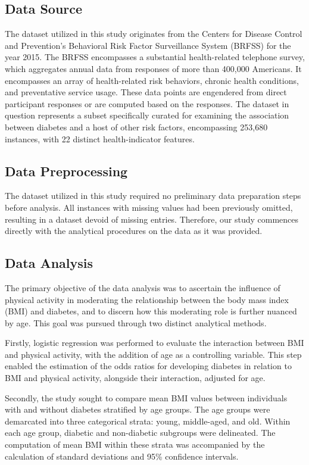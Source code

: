 \documentclass[11pt]{article}
\begin{document}
\subsection*{Data Source}
The dataset utilized in this study originates from the Centers for Disease Control and Prevention's Behavioral Risk Factor Surveillance System (BRFSS) for the year 2015. The BRFSS encompasses a substantial health-related telephone survey, which aggregates annual data from responses of more than 400,000 Americans. It encompasses an array of health-related risk behaviors, chronic health conditions, and preventative service usage. These data points are engendered from direct participant responses or are computed based on the responses. The dataset in question represents a subset specifically curated for examining the association between diabetes and a host of other risk factors, encompassing 253,680 instances, with 22 distinct health-indicator features.

\subsection*{Data Preprocessing}
The dataset utilized in this study required no preliminary data preparation steps before analysis. All instances with missing values had been previously omitted, resulting in a dataset devoid of missing entries. Therefore, our study commences directly with the analytical procedures on the data as it was provided.

\subsection*{Data Analysis}
The primary objective of the data analysis was to ascertain the influence of physical activity in moderating the relationship between the body mass index (BMI) and diabetes, and to discern how this moderating role is further nuanced by age. This goal was pursued through two distinct analytical methods.

Firstly, logistic regression was performed to evaluate the interaction between BMI and physical activity, with the addition of age as a controlling variable. This step enabled the estimation of the odds ratios for developing diabetes in relation to BMI and physical activity, alongside their interaction, adjusted for age.

Secondly, the study sought to compare mean BMI values between individuals with and without diabetes stratified by age groups. The age groups were demarcated into three categorical strata: young, middle-aged, and old. Within each age group, diabetic and non-diabetic subgroups were delineated. The computation of mean BMI within these strata was accompanied by the calculation of standard deviations and 95\% confidence intervals.
\end{document}
